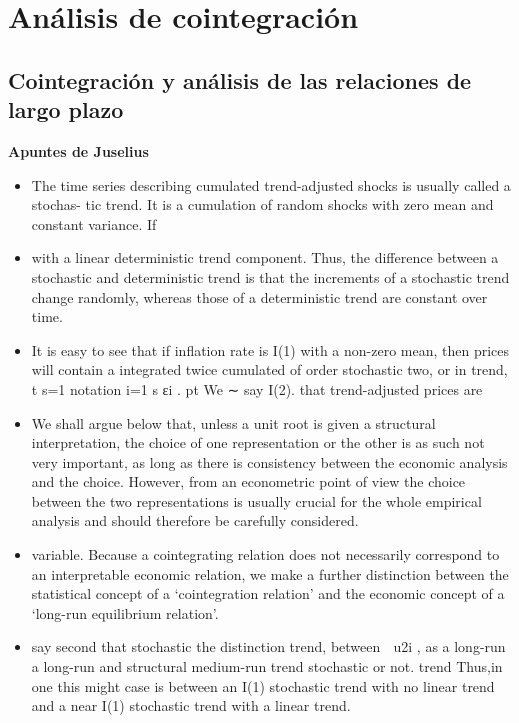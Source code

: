 \documentclass[12pt, twoside]{book}\usepackage[]{graphicx}\usepackage[]{color}
\numberwithin{equation}{section}
\numberwithin{theorem}{section}
\numberwithin{teorema}{section}
\numberwithin{defi}{section}
\numberwithin{prop}{section}
\numberwithin{defi}{section}
\theoremstyle{plain}
\begin{document}
\chapter{Análisis de cointegración}
\section{Cointegración y análisis de las relaciones de largo plazo}

{\color{red} \textbf{Apuntes de Juselius}

\begin{itemize}
\item The time series describing cumulated trend-adjusted shocks is usually called a stochas-
tic trend. It is a cumulation of random shocks with zero mean and constant variance. If
\item with a linear deterministic trend component. Thus, the difference between a stochastic
and deterministic trend is that the increments of a stochastic trend change randomly,
whereas those of a deterministic trend are constant over time.
\item It is easy to see that if inflation rate is I(1) with a non-zero mean, then prices will contain
a integrated twice cumulated of order stochastic two, or in trend, 
t
 s=1 notation
i=1 s
 εi . pt We ∼ say I(2).
 that trend-adjusted prices are
\item We shall argue below that, unless a unit root is given a structural interpretation, the
choice of one representation or the other is as such not very important, as long as there is
consistency between the economic analysis and the choice. However, from an econometric
point of view the choice between the two representations is usually crucial for the whole
empirical analysis and should therefore be carefully considered.
\item variable.
Because a cointegrating relation does not necessarily correspond to an interpretable
economic relation, we make a further distinction between the statistical concept of a
‘cointegration relation’ and the economic concept of a ‘long-run equilibrium relation’.
\item say second that stochastic the distinction trend,
 between 
 u2i , as a long-run a long-run and structural medium-run trend stochastic or not. trend Thus,in one this might
 case
is between an I(1) stochastic trend with no linear trend and a near I(1) stochastic trend
with a linear trend.





\end{itemize}

}
\end{document}
